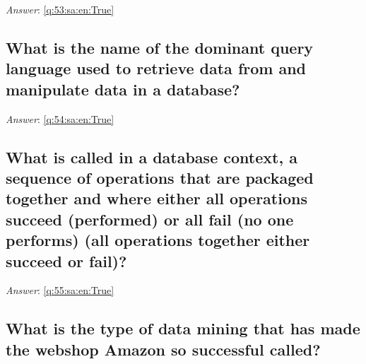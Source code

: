 \documentclass[a4paper,11pt,oneside]{article}
\begin{document}
\begin{sloppypar}
\noindent\makebox[\textwidth]{\hrulefill}

\vspace{1cm}

\textit{Answer}: \autoref{q:53:sa:en:True}



\subsection{What is the name of the dominant query language used to retrieve data from and manipulate data in a database?}

\label{q:54:sa:en:False}

\vspace{2cm}

\noindent\makebox[\textwidth]{\hrulefill}

\vspace{1cm}

\textit{Answer}: \autoref{q:54:sa:en:True}



\subsection{What is called in a database context, a sequence of operations that are packaged together and where either all operations succeed (performed) or all fail (no one performs) (all operations together either succeed or fail)?}

\label{q:55:sa:en:False}

\vspace{2cm}

\noindent\makebox[\textwidth]{\hrulefill}

\vspace{1cm}

\textit{Answer}: \autoref{q:55:sa:en:True}



\subsection{What is the type of data mining that has made the webshop Amazon so successful called?}

\label{q:56:sa:en:False}

\vspace{2cm}

\noindent\makebox[\textwidth]{\hrulefill}

\vspace{1cm}


\end{sloppypar}
\end{document}
